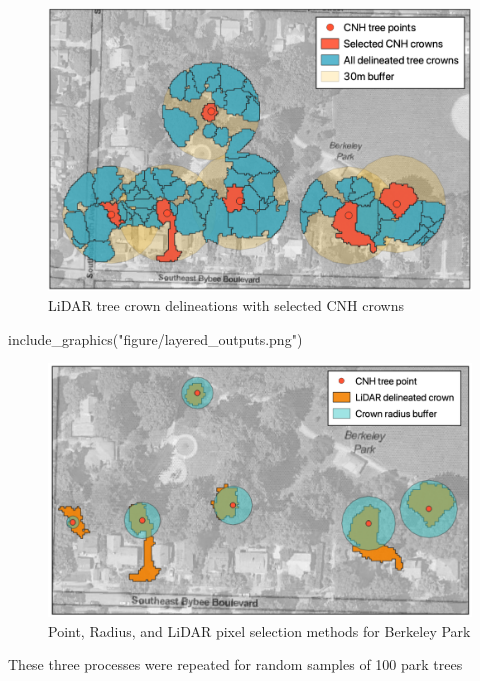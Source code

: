 \documentclass[12pt,twoside]{reedthesis}
\newenvironment{Shaded}{\begin{snugshade}}{\end{snugshade}}
\newcommand{\FunctionTok}[1]{\textcolor[rgb]{0.00,0.00,0.00}{#1}}
\newcommand{\NormalTok}[1]{#1}
\newcommand{\StringTok}[1]{\textcolor[rgb]{0.31,0.60,0.02}{#1}}
\begin{document}
\begin{figure}

{\centering \includegraphics[width=0.8\linewidth]{figure/selected_lidar} 

}

\caption{LiDAR tree crown delineations with selected CNH crowns}\label{fig:unnamed-chunk-5}
\end{figure}
\begin{Shaded}
\begin{Highlighting}[]
\FunctionTok{include\_graphics}\NormalTok{(}\StringTok{"figure/layered\_outputs.png"}\NormalTok{)}
\end{Highlighting}
\end{Shaded}
\begin{figure}

{\centering \includegraphics[width=0.9\linewidth]{figure/layered_outputs} 

}

\caption[Pixel selection method comparison]{Point, Radius, and LiDAR pixel selection methods for Berkeley Park}\label{fig:layered-outputs}
\end{figure}
These three processes were repeated for random samples of 100 park trees
\end{document}
